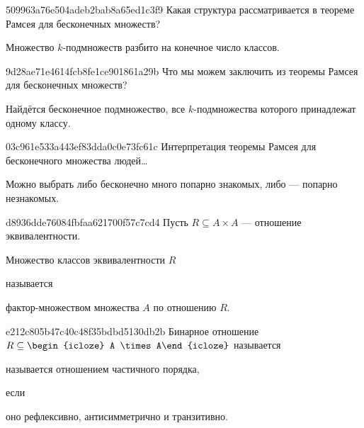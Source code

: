 \begin{note}{509963a76e504adeb2bab8a65ed1c3f9}
    Какая структура рассматривается в теореме Рамсея для бесконечных множеств?

    \begin{cloze}{1}
        Множество \({ k }\)-подмножеств разбито на конечное число классов.
    \end{cloze}
\end{note}

\begin{note}{9d28ae71e4614fcb8fe1ce901861a29b}
    Что мы можем заключить из теоремы Рамсея для бесконечных множеств?

    \begin{cloze}{1}
        Найдётся бесконечное подмножество, все \({ k }\)-под\-мно\-же\-ства которого принадлежат одному классу.
    \end{cloze}
\end{note}

\begin{note}{03c961e533a443ef83dda0c0e73fc61c}
    Интерпретация теоремы Рамсея для бесконечного множества людей\ldots

    \begin{cloze}{1}
        Можно выбрать либо бесконечно много попарно знакомых, либо --- попарно незнакомых.
    \end{cloze}
\end{note}

\begin{note}{d8936dde76084fbfaa621700f57c7cd4}
    Пусть \({ R \subseteq A \times A }\) --- отношение эквивалентности.
    \begin{icloze}{2}Множество классов эквивалентности \({ R }\)\end{icloze} называется \begin{icloze}{1}фактор-множеством множества \({ A }\) по отношению \({ R }\).\end{icloze}
\end{note}

\begin{note}{e212c805b47c40c48f35bdbd5130db2b}
    Бинарное отношение \({ R \subseteq \begin{icloze}{3}A \times A\end{icloze} }\) называется \begin{icloze}{2}называется отношением частичного порядка,\end{icloze} если \begin{icloze}{1}оно рефлексивно, антисимметрично и транзитивно.\end{icloze}
\end{note}

